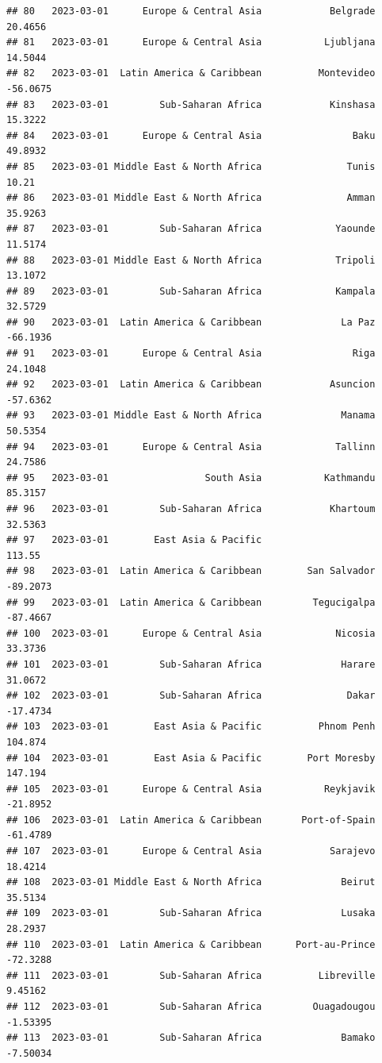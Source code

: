 \documentclass[
]{article}
\begin{document}
\begin{verbatim}
## 80   2023-03-01      Europe & Central Asia            Belgrade    20.4656
## 81   2023-03-01      Europe & Central Asia           Ljubljana    14.5044
## 82   2023-03-01  Latin America & Caribbean          Montevideo   -56.0675
## 83   2023-03-01         Sub-Saharan Africa            Kinshasa    15.3222
## 84   2023-03-01      Europe & Central Asia                Baku    49.8932
## 85   2023-03-01 Middle East & North Africa               Tunis      10.21
## 86   2023-03-01 Middle East & North Africa               Amman    35.9263
## 87   2023-03-01         Sub-Saharan Africa             Yaounde    11.5174
## 88   2023-03-01 Middle East & North Africa             Tripoli    13.1072
## 89   2023-03-01         Sub-Saharan Africa             Kampala    32.5729
## 90   2023-03-01  Latin America & Caribbean              La Paz   -66.1936
## 91   2023-03-01      Europe & Central Asia                Riga    24.1048
## 92   2023-03-01  Latin America & Caribbean            Asuncion   -57.6362
## 93   2023-03-01 Middle East & North Africa              Manama    50.5354
## 94   2023-03-01      Europe & Central Asia             Tallinn    24.7586
## 95   2023-03-01                 South Asia           Kathmandu    85.3157
## 96   2023-03-01         Sub-Saharan Africa            Khartoum    32.5363
## 97   2023-03-01        East Asia & Pacific                         113.55
## 98   2023-03-01  Latin America & Caribbean        San Salvador   -89.2073
## 99   2023-03-01  Latin America & Caribbean         Tegucigalpa   -87.4667
## 100  2023-03-01      Europe & Central Asia             Nicosia    33.3736
## 101  2023-03-01         Sub-Saharan Africa              Harare    31.0672
## 102  2023-03-01         Sub-Saharan Africa               Dakar   -17.4734
## 103  2023-03-01        East Asia & Pacific          Phnom Penh    104.874
## 104  2023-03-01        East Asia & Pacific        Port Moresby    147.194
## 105  2023-03-01      Europe & Central Asia           Reykjavik   -21.8952
## 106  2023-03-01  Latin America & Caribbean       Port-of-Spain   -61.4789
## 107  2023-03-01      Europe & Central Asia            Sarajevo    18.4214
## 108  2023-03-01 Middle East & North Africa              Beirut    35.5134
## 109  2023-03-01         Sub-Saharan Africa              Lusaka    28.2937
## 110  2023-03-01  Latin America & Caribbean      Port-au-Prince   -72.3288
## 111  2023-03-01         Sub-Saharan Africa          Libreville    9.45162
## 112  2023-03-01         Sub-Saharan Africa         Ouagadougou   -1.53395
## 113  2023-03-01         Sub-Saharan Africa              Bamako   -7.50034

\end{verbatim}
\end{document}
